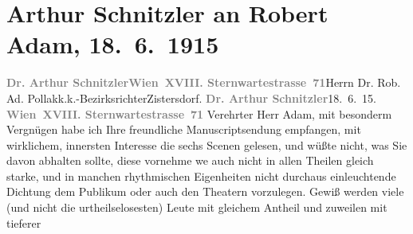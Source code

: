 

         
         \renewcommand{\erwaehntePersonen}{Personen: Robert Adam}
         \renewcommand{\erwaehnteOrte}{Orte: Sternwartestraße 71, Wien, Zistersdorf}
         \renewcommand{\erwaehnteWerke}{Werke: Der Fremde}
               \section[Arthur Schnitzler an Robert Adam, 18. 6. 1915]{ Arthur Schnitzler an Robert Adam, 18. 6. 1915}\nopagebreak{}\rehead{ }\begin{ledgroupsized}[t]{13cm}\normalsize\beginnumbering{} \toendnotes[C]{\smallbreak\pagebreak[2]} 
\toendnotes[C]{\smallbreak}\pstart{}{\pb}\textcolor{gray}{\textbf{Dr. Arthur Schnitzler}}\pend{}\pstart{}\textcolor{gray}{\textbf{Wien XVIII. Sternwartestrasse 71}}\pend{}{\bigskip}\pstart{}{\pb}Herrn Dr. Rob. Ad. Pollak\pend{}\pstart{}k.k.-Bezirksrichter\pend{}\pstart{}Zistersdorf.\pend{}{\bigskip}\pstart
           \noindent{}{\pb}\textcolor{gray}{\textbf{Dr. Arthur Schnitzler}}\hfill 18. 6. 15.\pend
           \pstart
           \textcolor{gray}{\textbf{Wien XVIII. Sternwartestrasse 71}}\pend
           \pstart{}Verehrter Herr Adam,\pend\pstart
           mit besonderm Vergnügen habe ich Ihre freundliche Manuscriptsendung empfangen, mit wirklichem, innersten
               Interesse die sechs Scenen gelesen, und wüßte nicht, was Sie davon abhalten sollte,
               diese vornehme we{\geminationn} auch nicht in allen Theilen gleich
               starke, und in manchen rhythmischen Eigenheiten nicht durchaus einleuchtende Dichtung
               dem Publikum oder auch den Theatern vorzulegen. Gewiß werden viele (und nicht die
               urtheilselosesten) {\pb}\introOben{}Leute\introOben{} mit gleichem Antheil und zuweilen mit tieferer

\end{ledgroupsized}
